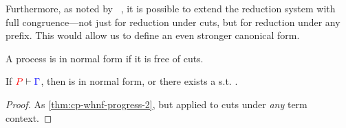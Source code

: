 Furthermore, as noted by \citeauthor{wadler2012}~\cite{wadler2012}, it is
possible to extend the reduction system with full congruence---not just for
reduction under cuts, but for reduction under any prefix.
This would allow us to define an even stronger canonical form.
\begin{definition}\label{def:cp-nf-canonical-forms}
  A process  is in normal form if it is free of cuts.
\end{definition}
\begin{theorem}[NF Progress]\label{thm:cp-nf-progress}
  If $\seq[{ P }]{ \Gamma }$, then  is in normal form, or there exists a
   s.t. .
\end{theorem}
\begin{proof}
  As \cref{thm:cp-whnf-progress-2}, but applied to cuts under \emph{any} term
  context.
\end{proof}
